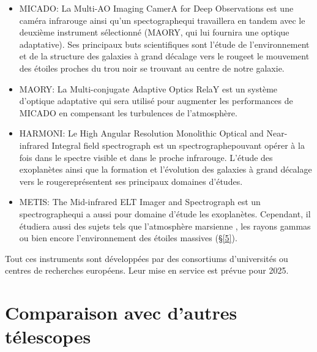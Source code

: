 \begin{itemize}
	
	\item MICADO: La Multi-AO Imaging CamerA for Deep Observations est une caméra infrarouge ainsi qu'un spectographe\footnotemark[1] qui travaillera en tandem avec le deuxième instrument sélectionné (MAORY, qui lui fournira une optique adaptative). Ses principaux buts scientifiques sont l'étude de l'environnement et de la structure des galaxies à grand décalage vers le rouge\footnotemark[2] et le mouvement des étoiles proches du trou noir se trouvant au centre de notre galaxie. 
	
	\item MAORY: La Multi-conjugate Adaptive Optics RelaY est un système d'optique adaptative qui sera utilisé pour augmenter les performances de MICADO en compensant les turbulences de l'atmosphère.
	
	\item HARMONI: Le High Angular Resolution Monolithic Optical and Near-infrared Integral field spectrograph est un spectrographe\footnotemark[1] pouvant opérer à la fois dans le spectre visible et dans le proche infrarouge. L'étude des exoplanètes ainsi que la formation et l'évolution des galaxies à grand décalage vers le rouge\footnotemark[2] représentent ses principaux domaines d'études.
	
	\item METIS: The Mid-infrared ELT Imager and Spectrograph est un spectrographe\footnotemark[1] qui a aussi pour domaine d'étude les exoplanètes. Cependant, il étudiera aussi des sujets tels que l'atmosphère marsienne , les rayons gammas ou bien encore l'environnement des étoiles massives (§\ref{5}).
	
\end{itemize}

Tout ces instruments sont développées par des consortiums d'universités ou centres de recherches européens. Leur mise en service est prévue pour 2025.
	
\vfill
{}	

\newpage

\section{Comparaison avec d'autres télescopes}

